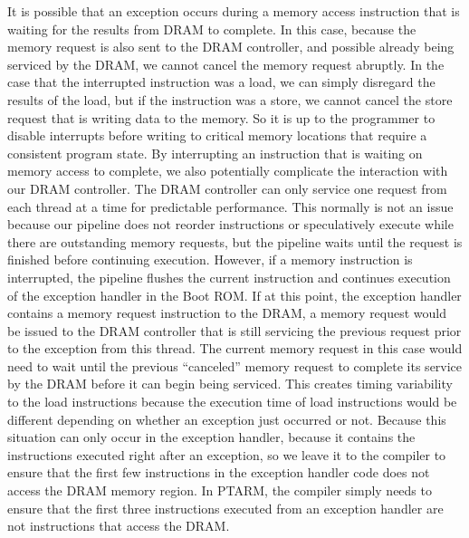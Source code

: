 It is possible that an exception occurs during a memory access instruction that is waiting for the results from DRAM to complete. 
In this case, because the memory request is also sent to the DRAM controller, and possible already being serviced by the DRAM, we cannot cancel the memory request abruptly.
In the case that the interrupted instruction was a load, we can simply disregard the results of the load, but if the instruction was a store, we cannot cancel the store request that is writing data to the memory.
So it is up to the programmer to disable interrupts before writing to critical memory locations that require a consistent program state.
By interrupting an instruction that is waiting on memory access to complete, we also potentially complicate the interaction with our DRAM controller.
The DRAM controller can only service one request from each thread at a time for predictable performance.
This normally is not an issue because our pipeline does not reorder instructions or speculatively execute while there are outstanding memory requests, but the pipeline waits until the request is finished before continuing execution.
However, if a memory instruction is interrupted, the pipeline flushes the current instruction and continues execution of the exception handler in the Boot ROM.
If at this point, the exception handler contains a memory request instruction to the DRAM, a memory request would be issued to the DRAM controller that is still servicing the previous request prior to the exception from this thread.
The current memory request in this case would need to wait until the previous ``canceled'' memory request to complete its service by the DRAM before it can begin being serviced.
This creates timing variability to the load instructions because the execution time of load instructions would be different depending on whether an exception just occurred or not.
Because this situation can only occur in the exception handler, because it contains the instructions executed right after an exception, so we leave it to the compiler to ensure that the first few instructions in the exception handler code does not access the DRAM memory region.
In PTARM, the compiler simply needs to ensure that the first three instructions executed from an exception handler are not instructions that access the DRAM.

